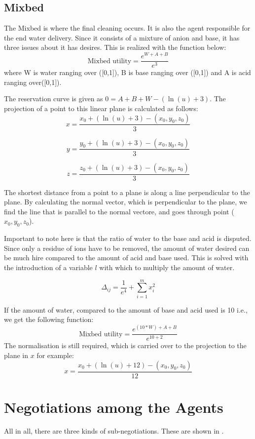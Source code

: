 \subsection{Mixbed}

The Mixbed is where the final cleaning occurs. It is also the agent responsible for the end water delivery. Since it consists of a mixture of anion and base, it has three issues about it has desires. This is realized with the function below:
\[
\text{Mixbed utility} = \frac{e^{W+A+B}}{e^3}
\] 
where W is water ranging over ([0,1]), B is base ranging over ([0,1]) and A is acid ranging over([0,1]).

The reservation curve is given as $0 = A+B+W - (\ln(u)+3)  $. The projection of a point to this linear plane is calculated as follows:
\[
x = \frac{x_0 + (\ln(u)+3) - (x_0, y_0, z_0)}{3}
\]

\[
y = \frac{y_0 + (\ln(u)+3) - (x_0, y_0, z_0)}{3} 
\]

\[
z = \frac{z_0 + (\ln(u)+3) - (x_0, y_0, z_0)}{3}
\]

The shortest distance from a point to a plane is along a line perpendicular to the plane. By calculating the normal vector, which is perpendicular to the plane, we find the line that is parallel to the normal vectore, and goes through point ($x_0, y_0, z_0$). 

Important to note here is that the ratio of water to the base and acid is disputed. Since only a residue of ions have to be removed, the amount of water desired can be much hire compared to the amount of acid and base used. This is solved with the introduction of a variable $l$ with which to multiply the amount of water. 

\[ \Delta_{ij} = \frac{1}{e^4} +\sum_{i=1}^m x^2_i \]

If the amount of water, compared to the amount of base and acid used is 10 i.e., we get the following function:
 \[
 \text{Mixbed utility} = \frac{e^{(10*W)+A+B}}{e^{10+2}}
 \] 
The normalisation is still required, which is carried over to the projection to the plane in $x$ for example:
\[
x = \frac{x_0 + (\ln(u)+12) - (x_0, y_0, z_0)}{12}
\]
\section{Negotiations among the Agents}
All in all, there are three kinds of sub-negotiations. These are shown in .

